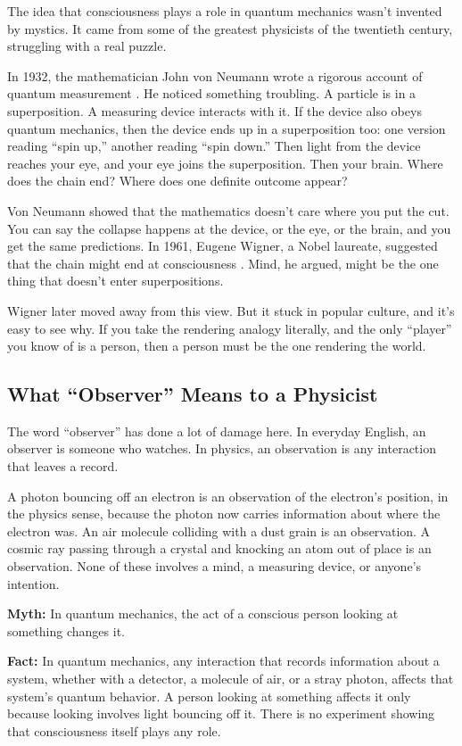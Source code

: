 The idea that consciousness plays a role in quantum mechanics wasn't invented by mystics. It came from some of the greatest physicists of the twentieth century, struggling with a real puzzle.

In 1932, the mathematician John von Neumann wrote a rigorous account of quantum measurement \cite{vonneumann1932}. He noticed something troubling. A particle is in a superposition. A measuring device interacts with it. If the device also obeys quantum mechanics, then the device ends up in a superposition too: one version reading ``spin up,'' another reading ``spin down.'' Then light from the device reaches your eye, and your eye joins the superposition. Then your brain. Where does the chain end? Where does one definite outcome appear?

Von Neumann showed that the mathematics doesn't care where you put the cut. You can say the collapse happens at the device, or the eye, or the brain, and you get the same predictions. In 1961, Eugene Wigner, a Nobel laureate, suggested that the chain might end at consciousness \cite{wigner1961}. Mind, he argued, might be the one thing that doesn't enter superpositions.

Wigner later moved away from this view. But it stuck in popular culture, and it's easy to see why. If you take the rendering analogy literally, and the only ``player'' you know of is a person, then a person must be the one rendering the world.

\subsection{What ``Observer'' Means to a Physicist}

The word ``observer'' has done a lot of damage here. In everyday English, an observer is someone who watches. In physics, an observation is any interaction that leaves a record.

A photon bouncing off an electron is an observation of the electron's position, in the physics sense, because the photon now carries information about where the electron was. An air molecule colliding with a dust grain is an observation. A cosmic ray passing through a crystal and knocking an atom out of place is an observation. None of these involves a mind, a measuring device, or anyone's intention.

\begin{mythvsfactbox}
\textbf{Myth:} In quantum mechanics, the act of a conscious person looking at something changes it.

\textbf{Fact:} In quantum mechanics, any interaction that records information about a system, whether with a detector, a molecule of air, or a stray photon, affects that system's quantum behavior. A person looking at something affects it only because looking involves light bouncing off it. There is no experiment showing that consciousness itself plays any role.
\end{mythvsfactbox}

